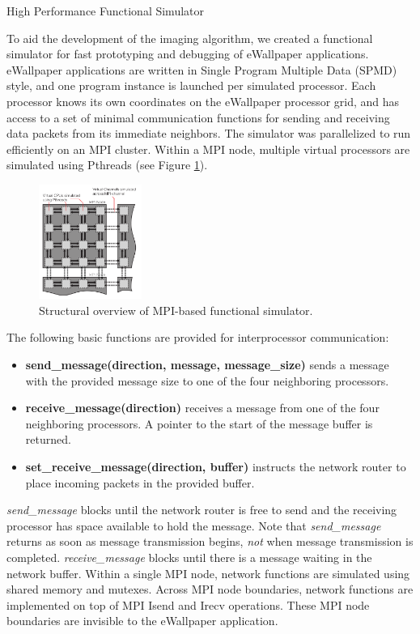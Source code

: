 \documentclass[twocolumn]{article}
\makeatletter
\def\section{\@startsection{section}{1}{\z@}{24pt plus 2 pt
minus 2 pt} {12pt plus 2pt minus 2pt}{\large\bf}}
\makeatother
\begin{document}
\section{High Performance Functional Simulator}

To aid the development of the imaging algorithm, we created a functional simulator for fast prototyping and debugging of eWallpaper applications. eWallpaper applications are written in Single Program Multiple Data (SPMD) style, and one program instance is launched per simulated processor. Each processor knows its own coordinates on the eWallpaper processor grid, and has access to a set of minimal communication functions for sending and receiving data packets from its immediate neighbors. The simulator was parallelized to run efficiently on an MPI cluster. Within a MPI node, multiple virtual processors are simulated using Pthreads (see Figure \ref{mpi_sim}).

\begin{figure}[!h]
\centering
\includegraphics*[width=0.3\textwidth]{figures/mpi_sim.pdf}
\caption{Structural overview of MPI-based functional simulator.}
\label{mpi_sim}
\end{figure}

The following basic functions are provided for interprocessor communication:
\begin{itemize}
	\item \textbf{send\_message(direction, message, message\_size)} sends a message with the provided message size to one of the four neighboring processors.
	\item \textbf{receive\_message(direction)} receives a message from one of the four neighboring processors. A pointer to the start of the message buffer is returned.
	\item \textbf{set\_receive\_message(direction, buffer)} instructs the network router to place incoming packets in the provided buffer.
\end{itemize}

{\em send\_message} blocks until the network router is free to send and the receiving processor has space available to hold the message. Note that {\em send\_message} returns as soon as message transmission begins, {\em not} when message transmission is completed. {\em receive\_message} blocks until there is a message waiting in the network buffer. Within a single MPI node, network functions are simulated using shared memory and mutexes. Across MPI node boundaries, network functions are implemented on top of MPI Isend and Irecv operations. These MPI node boundaries are invisible to the eWallpaper application.
\end{document}

